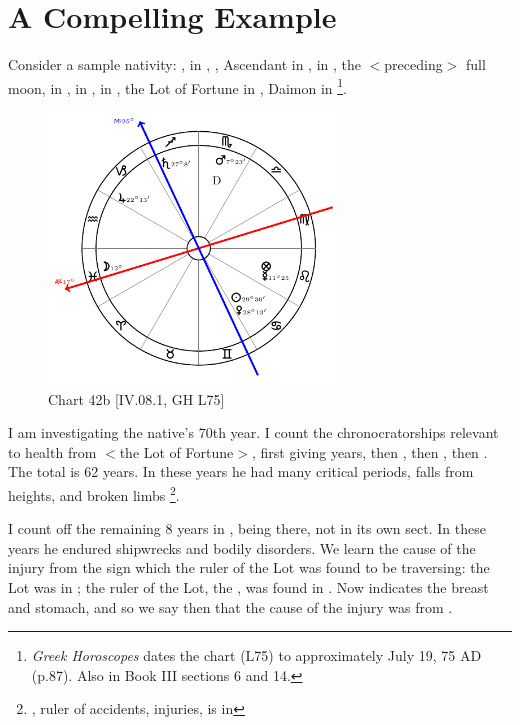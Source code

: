 \section{A Compelling Example}

Consider a sample nativity: \Sun, \Venus\xspace in \Cancer, \Moon, Ascendant in \Pisces, \Saturn\xspace in \Sagittarius,
the $<$preceding$>$ full moon, \Jupiter\xspace in \Capricorn, \Mars\xspace in \Scorpio, \Mercury\xspace in \Leo, the Lot of Fortune in \Leo, Daimon\xspace in \Scorpio
\footnote{\textit{Greek Horoscopes} dates the chart (L75) to approximately July 19, 75 AD (p.87). Also in Book III sections 6 and 14.}. 

\clearpage
\begin{figure}
\centering
\vspace{-20pt}
\includegraphics[width=0.68\textwidth]{charts/4_08_1}
\caption{Chart 42b [IV.08.1, GH L75]}
\label{fig:chart42b}
\end{figure} 

I am investigating the native’s 70th year. I count the chronocratorships relevant to health from \Leo\xspace $<$the Lot of Fortune$>$, first giving \Leo\xspace 19 years, then \Virgo\xspace 20, then \Libra\xspace 8, then \Scorpio\xspace 15. The total is 62 years. In these years he had many critical periods, falls from heights, and broken limbs \footnote{\Mars\xspace, ruler of accidents, injuries, is in \Scorpio}. 

I count off the remaining 8 years in \Sagittarius,\Saturn\xspace being there, not in its own sect. In these years he endured shipwrecks and bodily disorders. We learn the cause of the injury from the sign which the ruler of the Lot was found to be traversing: the Lot was in \Leo; the ruler of the Lot, the \Sun, was found in \Cancer. Now \Cancer\xspace indicates the breast and stomach, and so we say then that the cause of the injury was from \Cancer. 

